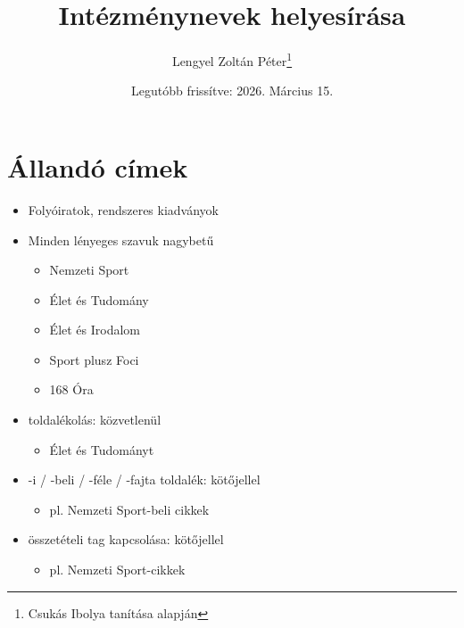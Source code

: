 \documentclass{article}
\title{Intézménynevek helyesírása}
\author{Lengyel Zoltán Péter\thanks{Csukás Ibolya tanítása alapján}}
\date{Legutóbb frissítve: 2026. Március 15.}
\begin{document}
\maketitle
\tableofcontents
\newpage

\section{Állandó címek}
\begin{itemize}
    \item Folyóiratok, rendszeres kiadványok 
    \item Minden lényeges szavuk nagybetű
    \begin{itemize}
        \item Nemzeti Sport
        \item Élet és Tudomány
        \item Élet és Irodalom
        \item Sport plusz Foci
        \item 168 Óra
    \end{itemize}
    \item toldalékolás: közvetlenül
    \begin{itemize}
        \item Élet és Tudományt
    \end{itemize}
    \item -i / -beli / -féle / -fajta toldalék: kötőjellel
    \begin{itemize}
        \item pl. Nemzeti Sport-beli cikkek
    \end{itemize}
    \item összetételi tag kapcsolása: kötőjellel
    \begin{itemize}
        \item pl. Nemzeti Sport-cikkek
    \end{itemize}
\end{itemize}
\end{document}
